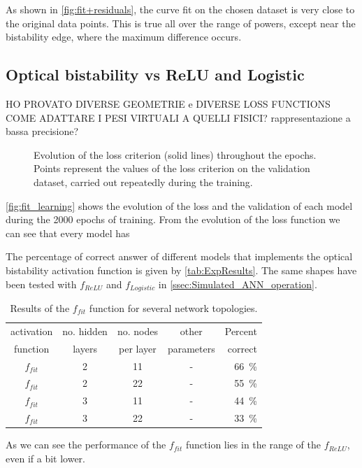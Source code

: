 As shown in \autoref{fig:fit+residuals}, the curve fit on the chosen dataset is very close to the original data points.
This is true all over the range of powers, except near the bistability edge, where the maximum difference occurs.

\subsection{Optical bistability vs ReLU and Logistic}
\label{ssec:OBvsReLUvsSIGM}
HO PROVATO DIVERSE GEOMETRIE e DIVERSE LOSS FUNCTIONS\\
COME ADATTARE I PESI VIRTUALI A QUELLI FISICI? rappresentazione a bassa precisione?


\begin{figure}[htbp]
	\centering
	
	\caption{Evolution of the loss criterion (solid lines) throughout the epochs.
		Points represent the values of the loss criterion on the validation dataset, carried out repeatedly during the training.
	}
	\label{fig:fit_learning}
\end{figure}

\autoref{fig:fit_learning} shows the evolution of the loss and the validation of each model during the \num{2000} epochs of training.
From the evolution of the loss function we can see that every model has 

The percentage of correct answer of different models that implements the optical bistability activation function is given by \autoref{tab:ExpResults}.
The same shapes have been tested with $f_{ReLU}$ and $f_{Logistic}$ in \autoref{ssec:Simulated_ANN_operation}.

\begin{table}[htbp]
	\centering
	\begin{tabular}{c c c c r}
	\toprule
	activation	& no. hidden 	& no. nodes	& other			& Percent\\
	function		& layers 			& per layer	& parameters	& correct\\
	\midrule
	$f_{fit}$ 			& 2 & 11 & - & \SI{66}{\percent}\\
	$f_{fit}$ 			& 2 & 22 & - & \SI{55}{\percent}\\
	$f_{fit}$ 			& 3 & 11 & - & \SI{44}{\percent}\\
	$f_{fit}$ 			& 3 & 22 & - & \SI{33}{\percent}\\
	\bottomrule
	\end{tabular}
	\caption{Results of the $f_{fit}$ function for several network topologies.
	}
	\label{tab:ExpResults}
\end{table}

As we can see the performance of the $f_{fit}$ function lies in the range of the $f_{ReLU}$, even if a bit lower.
